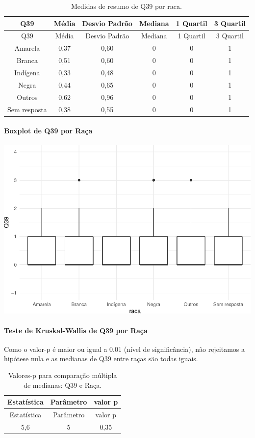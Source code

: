 \documentclass[]{article}
\let\oldparagraph\paragraph
\renewcommand{\paragraph}[1]{\oldparagraph{#1}\mbox{}}
\begin{document}
\begin{longtable}[]{@{}cccccc@{}}
\caption{\label{tab:unnamed-chunk-1521}Medidas de resumo de Q39 por raca.}\tabularnewline
\toprule
Q39 & Média & Desvio Padrão & Mediana & 1 Quartil & 3 Quartil\tabularnewline
\midrule
\endfirsthead
\toprule
Q39 & Média & Desvio Padrão & Mediana & 1 Quartil & 3 Quartil\tabularnewline
\midrule
\endhead
Amarela & 0,37 & 0,60 & 0 & 0 & 1\tabularnewline
Branca & 0,51 & 0,60 & 0 & 0 & 1\tabularnewline
Indígena & 0,33 & 0,48 & 0 & 0 & 1\tabularnewline
Negra & 0,44 & 0,65 & 0 & 0 & 1\tabularnewline
Outros & 0,62 & 0,96 & 0 & 0 & 1\tabularnewline
Sem resposta & 0,38 & 0,55 & 0 & 0 & 1\tabularnewline
\bottomrule
\end{longtable}

\hypertarget{boxplot-de-q39-por-rauxe7a}{%
\paragraph{Boxplot de Q39 por Raça}\label{boxplot-de-q39-por-rauxe7a}}

\begin{center}\includegraphics[width=0.75\linewidth]{relatorio_covid19_files/figure-latex/unnamed-chunk-1522-1} \end{center}

\hypertarget{teste-de-kruskal-wallis-de-q39-por-rauxe7a}{%
\paragraph{Teste de Kruskal-Wallis de Q39 por Raça}\label{teste-de-kruskal-wallis-de-q39-por-rauxe7a}}

Como o valor-p é maior ou igual a 0.01 (nível de significância), não rejeitamos a hipótese nula e as medianas de Q39 entre raças são todas iguais.

\begin{longtable}[]{@{}ccc@{}}
\caption{\label{tab:unnamed-chunk-1524}Valores-p para comparação múltipla de medianas: Q39 e Raça.}\tabularnewline
\toprule
Estatística & Parâmetro & valor p\tabularnewline
\midrule
\endfirsthead
\toprule
Estatística & Parâmetro & valor p\tabularnewline
\midrule
\endhead
5,6 & 5 & 0,35\tabularnewline
\bottomrule
\end{longtable}
\end{document}
